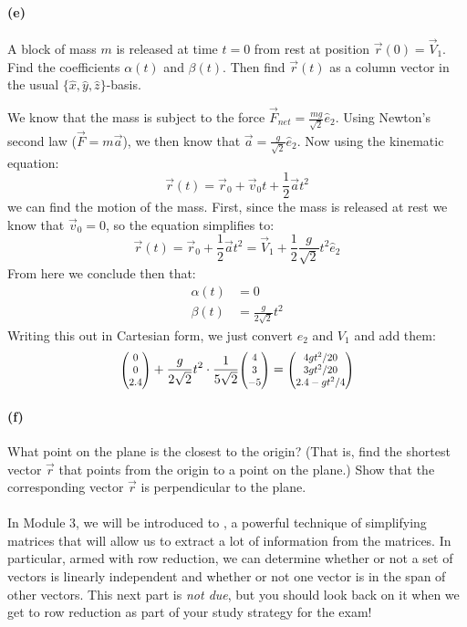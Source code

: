 \documentclass{article}
\begin{document}
\paragraph{(e)}
A block of mass $m$ is released at time $t=0$ from rest at position $\vec{r}(0) = \vec{V}_{1}$.  Find the coefficients $\alpha(t)$ and $\beta(t)$.  Then find
$\vec{r}(t)$ as a column vector in the usual $\{\hat{x},\hat{y},\hat{z}\}$-basis.

\begin{solution}
    We know that the mass is subject to the force $\vec F_{net} = \frac{mg}{\sqrt{2}}\hat e_2$. Using Newton's second law ($\vec F = m\vec a$), we then know that $\vec a = \frac{g}{\sqrt{2}}\hat e_2$. Now using the kinematic equation: 
    \[ \vec r(t) = \vec r_0 + \vec v_0 t + \frac{1}{2}\vec at^2\] 
    we can find the motion of the mass. First, since the mass is released at rest we know that $\vec v_0 = 0$, so the equation simplifies to: 
    \[ \vec r(t) = \vec r_0 + \frac{1}{2} \vec a t^2 = \vec V_1 + \frac{1}{2} \frac{g}{\sqrt{2}}t^2 \hat e_2\]
    From here we conclude then that: 
    \begin{align*}
        \alpha(t) &= 0\\
        \beta(t) &= \frac{g}{2\sqrt{2}}t^2
    \end{align*}
    Writing this out in Cartesian form, we just convert $\hat e_2$ and $V_1$ and add them: 
    \[ \smthreevect{0}{0}{2.4} + \frac{g}{2\sqrt{2}}t^2 \cdot \frac{1}{5\sqrt{2}} \smthreevect{4}{3}{-5} = \smthreevect{4gt^2/20}{3gt^2/20}{2.4 - gt^2/4}\]
\end{solution}


\paragraph{(f)}		\extrapart
What point on the plane is the closest to the origin?  (That is, find the shortest vector $\vec{r}$ that points from the origin to a point on the plane.) 
Show that the corresponding vector $\vec{r}$ is perpendicular to the plane.


\dphline
\paragraph{}
In Module 3, we will be introduced to , a powerful technique of simplifying matrices that will allow us to extract a lot of
information from the matrices.  In particular, armed with row reduction, we can determine whether or not a set of vectors is linearly independent and whether or not one vector is in 
the span of other vectors.  This next part is \emph{not due}, but you should look back on it when we get to row reduction as part of your study strategy for the exam!
\end{document}
